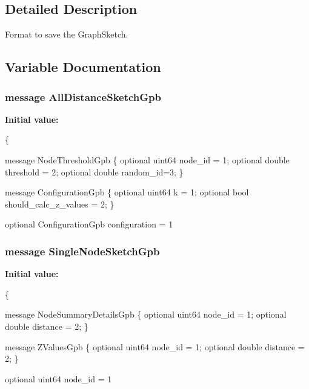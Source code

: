 \subsection{Detailed Description}
Format to save the Graph\+Sketch. 



\subsection{Variable Documentation}
\hypertarget{all__distance__sketch_8proto_a1c725f8168567dbd3aa867b4bebba2a0}{}
\subsubsection[{All\+Distance\+Sketch\+Gpb}]{\setlength{\rightskip}{0pt plus 5cm}message All\+Distance\+Sketch\+Gpb}\label{all__distance__sketch_8proto_a1c725f8168567dbd3aa867b4bebba2a0}
{\bfseries Initial value\+:}
\begin{DoxyCode}
\{
  
  message NodeThresholdGpb \{
      optional uint64 node\_id = 1;
      optional \textcolor{keywordtype}{double} threshold = 2;
      optional \textcolor{keywordtype}{double} random\_id=3;
  \}

message ConfigurationGpb \{
  optional uint64 k = 1;
  optional \textcolor{keywordtype}{bool} should\_calc\_z\_values = 2;
\}

  optional ConfigurationGpb configuration = 1
\end{DoxyCode}
\hypertarget{all__distance__sketch_8proto_a439dc8f2c6166ba58d497513ebc92723}{}
\subsubsection[{Single\+Node\+Sketch\+Gpb}]{\setlength{\rightskip}{0pt plus 5cm}message Single\+Node\+Sketch\+Gpb}\label{all__distance__sketch_8proto_a439dc8f2c6166ba58d497513ebc92723}
{\bfseries Initial value\+:}
\begin{DoxyCode}
\{
  
  message NodeSummaryDetailsGpb \{
      optional uint64 node\_id = 1;
      optional \textcolor{keywordtype}{double} distance = 2;
  \}

  message ZValuesGpb \{
    optional uint64 node\_id = 1;
    optional \textcolor{keywordtype}{double} distance = 2;
  \}

  optional uint64 node\_id = 1
\end{DoxyCode}
